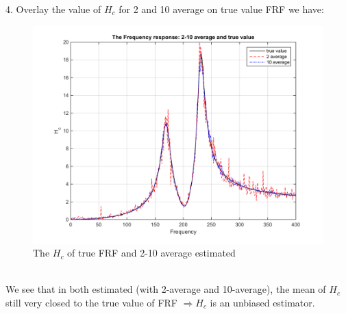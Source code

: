 \documentclass[14pt,a4paper]{article}
\begin{document}
4. Overlay the value of $H_c$ for 2 and 10 average on true value FRF we have:
\begin{figure}[htp]
	\centering
	\includegraphics[scale=0.8]{fn4_VB4_1.png}
	\caption{The $H_c$ of true FRF and 2-10 average estimated}
\end{figure}\\
We see that in both estimated (with 2-average and 10-average), the mean of $H_c$ still very closed to the true value of FRF $\Rightarrow H_c$ is an unbiased estimator.
\end{document}
